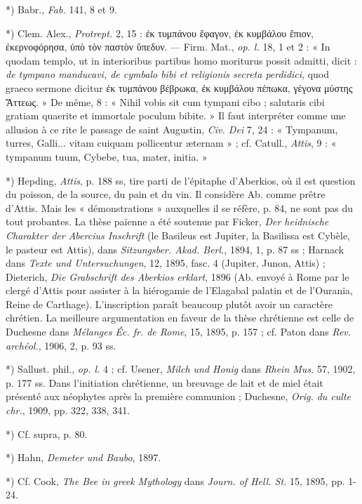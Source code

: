 \documentclass[a4paper, 11pt, oneside, polutonikogreek, french]{article}
\begin{document}
*) Babr., \emph{Fab.} 141, 8 et 9.

*) Clem. Alex., \emph{Protrept.} 2, 15 : ἐκ τυμπάνου ἔφαγον, ἐκ κυμβάλου ἔπιον, ἐκερνοφόρησα, ὑπὸ τὸν παστὸν ὕπεδυν. --- Firm. Mat., \emph{op. l.} 18, 1 et 2 : « In quodam templo, ut in interioribus partibus homo moriturus possit admitti, dicit : \emph{de tympano manducavi, de cymbalo bibi et religionis secreta perdidici}, quod graeco sermone dicitur ἐκ τυμπάνου βέβρωκα, ἐκ κυμβάλου πέπωκα, γέγονα μύστης Ἄττεως. » De même, 8 : « Nihil vobis sit cum tympani cibo ; salutaris cibi gratiam quaerite et immortale poculum bibite. » Il faut interpréter comme une allusion à ce rite le passage de saint Augustin, \emph{Civ. Dei} 7, 24 : « Tympanum, turres, Galli... vitam cuiquam pollicentur æternam » ; cf. Catull., \emph{Attis}, 9 : « tympanum tuum, Cybebe, tua, mater, initia. »

*) Hepding, \emph{Attis}, p. 188 ss, tire parti de l'épitaphe d'Aberkios, où il est question du poisson, de la source, du pain et du vin. Il considère Ab. comme prêtre d'Attis. Mais les « démonstrations » auxquelles il se réfère, p. 84, ne sont pas du tout probantes. La thèse païenne a été soutenue par Ficker, \emph{Der heidnische Charakter der Abercius Inschrift} (le Basileus est Jupiter, la Basilissa est Cybèle, le pasteur est Attis), dans \emph{Sitzungsber. Akad. Berl.}, 1894, 1, p. 87 ss ; Harnack dans \emph{Texte und Untersuchungen}, 12, 1895, fasc. 4 (Jupiter, Junon, Attis) ; Dieterich, \emph{Die Grabschrift des Aberkios erklart}, 1896 (Ab. envoyé à Rome par le clergé d'Attis pour assister à la hiérogamie de l'Elagabal palatin et de l'Ourania, Reine de Carthage). L'inscription paraît beaucoup plutôt avoir un caractère chrétien. La meilleure argumentation en faveur de la thèse chrétienne est celle de Duchesne dans \emph{Mélanges Éc. fr. de Rome}, 15, 1895, p. 157 ; cf. Paton dans \emph{Rev. archéol.}, 1906, 2, p. 93 ss.

*) Sallust. phil., \emph{op. l.} 4 ; cf. Usener, \emph{Milch und Honig} dans \emph{Rhein Mus.} 57, 1902, p. 177 ss. Dans l'initiation chrétienne, un breuvage de lait et de miel était présenté aux néophytes après la première communion ; Duchesne, \emph{Orig. du culte chr.}, 1909, pp. 322, 338, 341.

*) Cf. supra, p. 80.

*) Hahn, \emph{Demeter und Baubo}, 1897.

*) Cf. Cook, \emph{The Bee in greek Mythology} dans \emph{Journ. of Hell. St.} 15, 1895, pp. 1-24.
\end{document}
